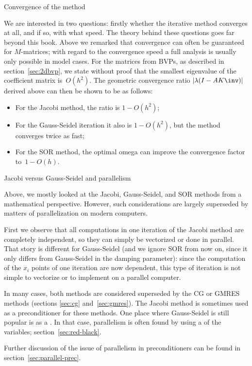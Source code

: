  {Convergence of the method}

We are interested in two questions: firstly whether the iterative
method converges at all, and if so, with what speed.  The theory
behind these questions goes far beyond this book. Above we remarked
that convergence can often be guaranteed for $M$-matrices; with regard to
the convergence speed a full analysis is usually only possible in
model cases. For the matrices from \acp{BVP}, as described in
section~\ref{sec:2dbvp}, we state without proof that the smallest
eigenvalue of the coefficient matrix is~$O(h^2)$. The geometric
convergence ratio $|\lambda(I-AK\inv)|$ derived above can then be
shown to be as follows:
\begin{itemize}
\item For the Jacobi method, the ratio is $1-O(h^2)$;
\item For the Gauss-Seidel iteration it also is $1-O(h^2)$, but the
  method converges twice as fast;
\item For the SOR method, the optimal omega can improve the
  convergence factor to~$1-O(h)$.
\end{itemize}

 {Jacobi versus Gauss-Seidel and parallelism}
\label{sec:jac-gs-parallel}

Above, we mostly looked at the Jacobi, Gauss-Seidel, and SOR methods
from a mathematical perspective.
However, such considerations are largely superseded by matters
of parallelization on modern computers.

First we observe that all computations in one iteration of the Jacobi
method are completely independent, so they can simply be vectorized or
done in parallel. That story is different for Gauss-Seidel (and we
ignore SOR from now on, since it only differs from Gauss-Seidel in the
damping  parameter):
since the computation of the
$x_i$ points of one iteration are now dependent, this type of
iteration is not simple
to vectorize or
to implement on a parallel computer.

In many cases, both methods are considered superseded by the \ac{CG}
or \ac{GMRES} methods (sections \ref{sec:cg} and~\ref{sec:gmres}). The
Jacobi method is sometimes used as a preconditioner for these methods.
One place where Gauss-Seidel is still popular is as a
. In that case, parallelism is often
found by using a  of the variables;
section~\ref{sec:red-black}.

Further discussion of the issue of parallelism in preconditioners
can be found in section~\ref{sec:parallel-prec}.

